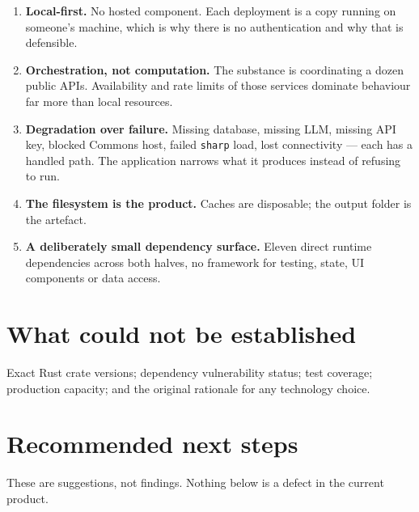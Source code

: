 \documentclass[11pt,a4paper]{report}
\newcommand{\code}[1]{\texttt{\small #1}}
\begin{document}
\begin{enumerate}
\item \textbf{Local-first.} No hosted component. Each deployment is a copy
running on someone's machine, which is why there is no authentication and why
that is defensible.
\item \textbf{Orchestration, not computation.} The substance is coordinating a
dozen public APIs. Availability and rate limits of those services dominate
behaviour far more than local resources.
\item \textbf{Degradation over failure.} Missing database, missing LLM, missing
API key, blocked Commons host, failed \code{sharp} load, lost connectivity --- each
has a handled path. The application narrows what it produces instead of
refusing to run.
\item \textbf{The filesystem is the product.} Caches are disposable; the output
folder is the artefact.
\item \textbf{A deliberately small dependency surface.} Eleven direct runtime
dependencies across both halves, no framework for testing, state, UI components
or data access.
\end{enumerate}

\section{What could not be established}

Exact Rust crate versions; dependency vulnerability status; test coverage;
production capacity; and the original rationale for any technology choice.

\section{Recommended next steps}

These are suggestions, not findings. Nothing below is a defect in the current
product.
\end{document}
